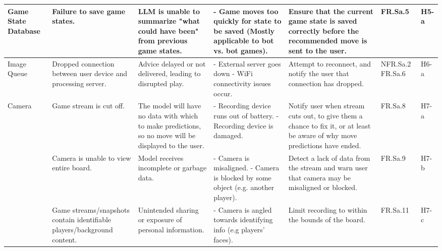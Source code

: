 \documentclass{article}
\begin{document}
\begin{landscape}
\begin{tabularx}{\linewidth}{|P{2.3cm}|Y|Y|Y|Y|P{1.4cm}|P{0.8cm}|}
        \hline

        Game State Database &
        Failure to save game states. &
        LLM is unable to summarize "what could have been" from previous game states. &
        - Game moves too quickly for state to be saved (Mostly applicable to bot vs. bot games). &
        Ensure that the current game state is saved correctly before the recommended move is sent to the user. &
        FR.Sa.5 &
        H5-a \\

        \hline

        Image Queue &
        Dropped connection between user device and processing server. &
        Advice delayed or not delivered, leading to disrupted play. &
        - External server goes down \newline - WiFi connectivity issues occur. &
        Attempt to reconnect, and notify the user that connection has dropped. &
        NFR.Sa.2 \newline FR.Sa.6 &
        H6-a \\

        \hline

        Camera &
        Game stream is cut off. &
        The model will have no data with which to make predictions, so no move will be displayed to the user. &
        - Recording device runs out of battery. \newline - Recording device is damaged. &
        Notify user when stream cuts out, to give them a chance to fix it, or at least be aware of why move predictions have ended. &
        FR.Sa.8 &
        H7-a \\

        &
        Camera is unable to view entire board. &
        Model receives incomplete or garbage data. &
        - Camera is misaligned. \newline - Camera is blocked by some object (e.g. another player). &
        Detect a lack of data from the stream and warn user that camera may be misaligned or blocked. &
        FR.Sa.9 &
        H7-b \\

        &
        Game streams/snapshots contain identifiable players/background content. &
        Unintended sharing or exposure of personal information. &
        - Camera is angled towards identifying info (e.g players' faces). &
        Limit recording to within the bounds of the board. &
        FR.Sa.11 &
        H7-c \\


\end{tabularx}
\end{landscape}
\end{document}
